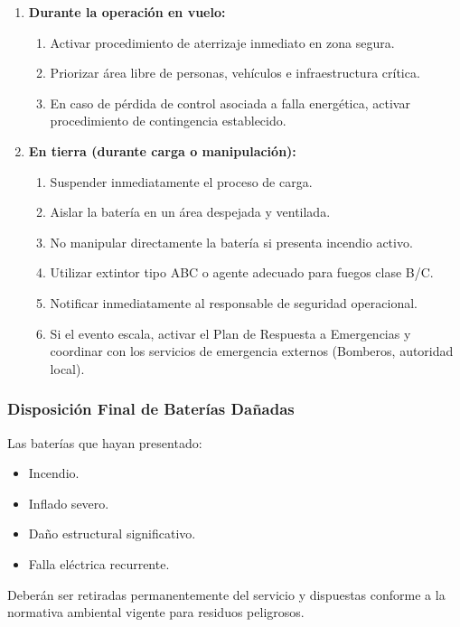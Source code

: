 \begin{enumerate}
    \item \textbf{Durante la operación en vuelo:}
        \begin{enumerate}
            \item Activar procedimiento de aterrizaje inmediato en zona segura.

            \item Priorizar área libre de personas, vehículos e infraestructura crítica.

            \item En caso de pérdida de control asociada a falla energética, activar procedimiento de contingencia establecido.
        \end{enumerate}
    
    \item \textbf{En tierra (durante carga o manipulación):}
        \begin{enumerate}
            \item Suspender inmediatamente el proceso de carga.

            \item Aislar la batería en un área despejada y ventilada.

            \item No manipular directamente la batería si presenta incendio activo.

            \item Utilizar extintor tipo ABC o agente adecuado para fuegos clase B/C.

            \item Notificar inmediatamente al responsable de seguridad operacional.

            \item Si el evento escala, activar el Plan de Respuesta a Emergencias y coordinar con los servicios de emergencia externos (Bomberos, autoridad local).
        \end{enumerate}
\end{enumerate}

\subsubsection{Disposición Final de Baterías Dañadas}
Las baterías que hayan presentado:

\begin{itemize}
    \item Incendio.

    \item Inflado severo.

    \item Daño estructural significativo.

    \item Falla eléctrica recurrente.
\end{itemize}
Deberán ser retiradas permanentemente del servicio y dispuestas conforme a la normativa ambiental vigente para residuos peligrosos.\\

